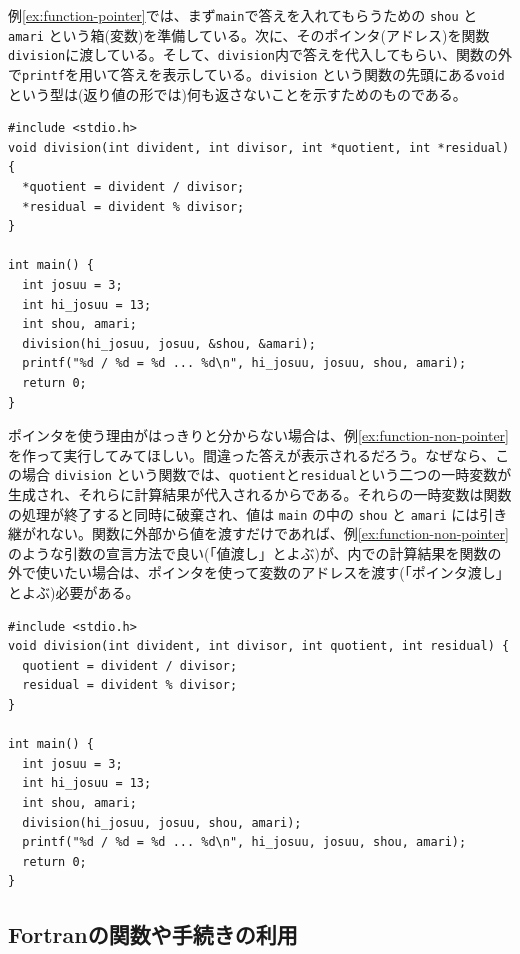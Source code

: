例\ref{ex:function-pointer}では、まず{\tt main}で答えを入れてもらうための \verb|shou| と \verb|amari| という箱(変数)を準備している。次に、そのポインタ(アドレス)を関数\verb|division|に渡している。そして、\verb|division|内で答えを代入してもらい、関数の外で\verb|printf|を用いて答えを表示している。\verb|division| という関数の先頭にある\verb|void|という型は(返り値の形では)何も返さないことを示すためのものである。
\begin{reidai}\label{ex:function-pointer}
\begin{verbatim}
#include <stdio.h>
void division(int divident, int divisor, int *quotient, int *residual) {
  *quotient = divident / divisor;
  *residual = divident % divisor;
}

int main() {
  int josuu = 3;
  int hi_josuu = 13;
  int shou, amari;
  division(hi_josuu, josuu, &shou, &amari);
  printf("%d / %d = %d ... %d\n", hi_josuu, josuu, shou, amari);
  return 0;
}
\end{verbatim}
\end{reidai} \noindent
ポインタを使う理由がはっきりと分からない場合は、例\ref{ex:function-non-pointer}を作って実行してみてほしい。間違った答えが表示されるだろう。なぜなら、この場合 \verb|division| という関数では、\verb|quotient|と\verb|residual|という二つの一時変数が生成され、それらに計算結果が代入されるからである。それらの一時変数は関数の処理が終了すると同時に破棄され、値は \verb|main| の中の \verb|shou| と \verb|amari| には引き継がれない。関数に外部から値を渡すだけであれば、例\ref{ex:function-non-pointer}のような引数の宣言方法で良い(「値渡し」とよぶ)が、内での計算結果を関数の外で使いたい場合は、ポインタを使って変数のアドレスを渡す(「ポインタ渡し」とよぶ)必要がある。
\begin{reidai}\label{ex:function-non-pointer}
\begin{verbatim}
#include <stdio.h>
void division(int divident, int divisor, int quotient, int residual) {
  quotient = divident / divisor;
  residual = divident % divisor;
}

int main() {
  int josuu = 3;
  int hi_josuu = 13;
  int shou, amari;
  division(hi_josuu, josuu, shou, amari);
  printf("%d / %d = %d ... %d\n", hi_josuu, josuu, shou, amari);
  return 0;
}
\end{verbatim}
\end{reidai}

\subsection {Fortranの関数や手続きの利用}

